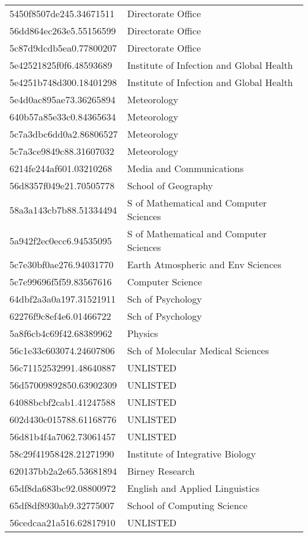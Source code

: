 \begin{tabular}{ll}
5450f8507de245.34671511 & Directorate Office \\
56dd864ec263e5.55156599 & Directorate Office \\
5c87d9dcdb5ea0.77800207 & Directorate Office \\
5e42521825f0f6.48593689 & Institute of Infection and Global Health \\
5e4251b748d300.18401298 & Institute of Infection and Global Health \\
5e4d0ac895ae73.36265894 & Meteorology \\
640b57a85e33c0.84365634 & Meteorology \\
5c7a3dbc6dd0a2.86806527 & Meteorology \\
5c7a3ce9849c88.31607032 & Meteorology \\
6214fe244af601.03210268 & Media and Communications \\
56d8357f049e21.70505778 & School of Geography \\
58a3a143cb7b88.51334494 & S of Mathematical and Computer Sciences \\
5a942f2ec0ecc6.94535095 & S of Mathematical and Computer Sciences \\
5c7e30bf0ae276.94031770 & Earth Atmospheric and Env Sciences \\
5c7e99696f5f59.83567616 & Computer Science \\
64dbf2a3a0a197.31521911 & Sch of Psychology \\
62276f9c8ef4e6.01466722 & Sch of Psychology \\
5a8f6cb4c69f42.68389962 & Physics \\
56c1e33c603074.24607806 & Sch of Molecular Medical Sciences \\
56c71152532991.48640887 & UNLISTED \\
56d57009892850.63902309 & UNLISTED \\
64088bcbf2cab1.41247588 & UNLISTED \\
602d430c015788.61168776 & UNLISTED \\
56d81b4f4a7062.73061457 & UNLISTED \\
58c29f41958428.21271990 & Institute of Integrative Biology \\
620137bb2a2e65.53681894 & Birney Research \\
65df8da683bc92.08800972 & English and Applied Linguistics \\
65df8df8930ab9.32775007 & School of Computing Science \\
56cedcaa21a516.62817910 & UNLISTED \\

\end{tabular}
